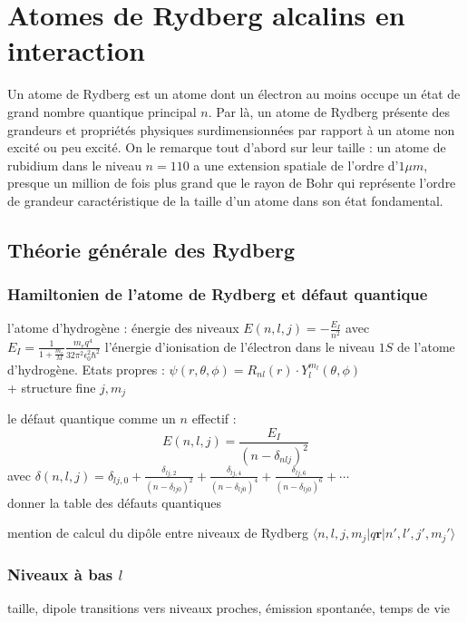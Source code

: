 \chapter{Atomes de Rydberg alcalins en interaction}
\label{chapter:Rydberg}

Un atome de Rydberg est un atome dont un électron au moins occupe un état de grand nombre quantique principal $n$.
Par là, un atome de Rydberg présente des grandeurs et propriétés physiques surdimensionnées par rapport à un atome non excité ou peu excité.
On le remarque tout d'abord sur leur taille : un atome de rubidium dans le niveau $n=110$ a une extension spatiale de l'ordre d'$1 \mu m$, presque un million de fois plus grand que le rayon de Bohr qui représente l'ordre de grandeur caractéristique de la taille d'un atome dans son état fondamental.

\section{Théorie générale des Rydberg}
	\subsection{Hamiltonien de l'atome de Rydberg et défaut quantique}
		\noindent l'atome d'hydrogène : énergie des niveaux $E(n,l,j)= - \frac{E_I}{n^2}$
		avec $E_I = \frac{1}{1+\frac{m_e}{M}}\frac{m_e q^4}{32\pi^2 \epsilon _0^2 \hbar ^2}$ l'énergie d'ionisation de l'électron dans le niveau $1S$ de l'atome d'hydrogène.
		Etats propres : $\psi(r,\theta,\phi) = R_{nl}(r)\cdot Y_l^{m_l}(\theta,\phi)$
		\\
		+ structure fine $j,m_j$
		\bigskip
		
		\noindent le défaut quantique comme un $n$ effectif : 
		\[
		E(n,l,j) = \frac{E_I}{(n-\delta_{nlj})^2}
		\]
		avec $\delta(n,l,j)=\delta_{lj,0} + \frac{\delta_{lj,2}}{(n-\delta_{lj0})^2} + \frac{\delta_{lj,4}}{(n-\delta_{lj0})^4} + \frac{\delta_{lj,6}}{(n-\delta_{lj0})^6} + \cdots$ \\
		donner la table des défauts quantiques
		\bigskip
		
		\noindent mention de calcul du dipôle entre niveaux de Rydberg $\langle n,l,j,m_j | q \mathbf{r} |n',l',j',m_j'\rangle$
		
	\subsection{Niveaux à bas $l$}
		\noindent taille, dipole
		\noindent transitions vers niveaux proches, émission spontanée, temps de vie
